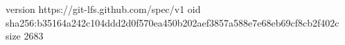 version https://git-lfs.github.com/spec/v1
oid sha256:b35164a242c104ddd2d0f570ea450b202aef3857a588e7e68eb69cf8cb2f402c
size 2683
